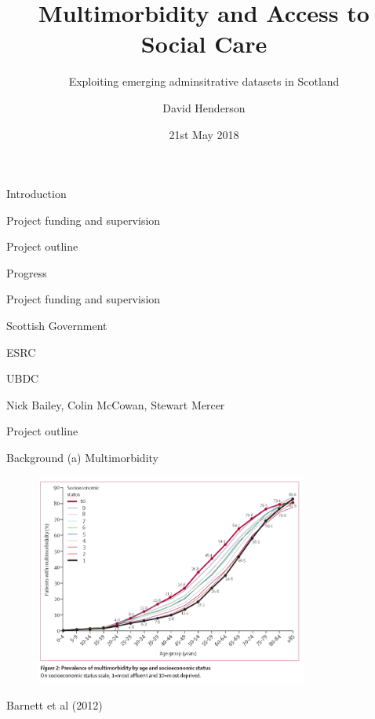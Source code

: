 \documentclass[ignorenonframetext,]{beamer}
\institute{University of Glasgow}
\title{Multimorbidity and Access to Social Care}
\subtitle{Exploiting emerging adminsitrative datasets in Scotland}
\author{David Henderson}
\date{21st May 2018}
\newenvironment{wideitemize}{\itemize\addtolength{\itemsep}{20pt}}{\enditemize}
\begin{document}
\frame{\titlepage}

\begin{frame}{Introduction}

\begin{wideitemize}
\item  Project funding and supervision
\item  Project outline
\item  Progress
\end{wideitemize}

\end{frame}

\begin{frame}{Project funding and supervision}

\begin{wideitemize}
\item<1-> Scottish Government
\item<2-> ESRC
\item<3-> UBDC
\item<4-> Nick Bailey, Colin McCowan, Stewart Mercer
\end{wideitemize}

\end{frame}

\begin{frame}{Project outline}

\begin{block}{Background (a) Multimorbidity}

\begin{figure}
\centerline{\includegraphics[width=0.8\textwidth, height=0.6\textheight]{images/Prev_multi_morb.png}}
\end{figure}

Barnett et al (2012)

\end{block}

\end{frame}
\end{document}
